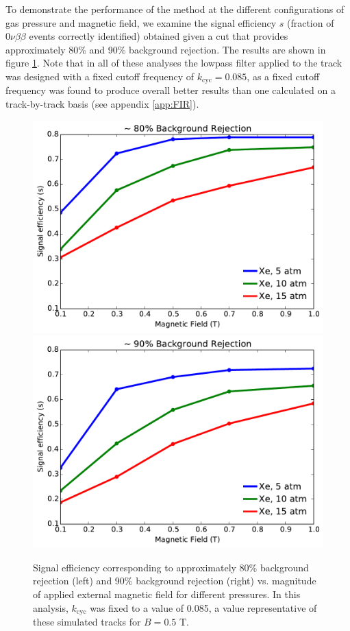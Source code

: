 \documentclass{JINST}
\begin{document}
To demonstrate the performance of the method at the different configurations of gas pressure and magnetic 
field, we examine the signal efficiency $s$ (fraction of $0\nu\beta\beta$ events correctly identified) obtained 
given a cut that provides approximately 80\% and 90\% background rejection.  The results are shown in figure 
\ref{fig_config}.  Note that in all of these analyses the lowpass filter applied to the track was designed with
a fixed cutoff frequency of $k_{\mathrm{cyc}} = 0.085$, as a fixed cutoff frequency was found to produce overall
better results than one calculated on a track-by-track basis (see appendix \ref{app:FIR}).  

\begin{figure}[!htb]
	\centering
	\includegraphics[scale=0.43]{fig/eff_vs_b_80.pdf}
	\includegraphics[scale=0.43]{fig/eff_vs_b_90.pdf}
	\caption{\label{fig_config}Signal efficiency corresponding to approximately 80\% background rejection (left) and 90\% background rejection (right) vs. magnitude of applied external magnetic field for different pressures.  In this analysis, $k_{\mathrm{cyc}}$ was fixed to a value of 0.085, a value representative of these simulated tracks for $B = 0.5$ T.}  %
\end{figure}
\end{document}
